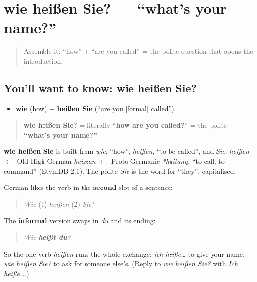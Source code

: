 \section[wie heißen Sie?]{wie heißen Sie? — \textquotedblleft{}what's your name?\textquotedblright{}}

\label{lesson:GE-C02-wie-heissen-sie}



\begin{quote}
Assemble it: \textquotedblleft{}how\textquotedblright{} + \textquotedblleft{}are you called\textquotedblright{} = the polite question that opens the introduction.
\end{quote}

\subsection*{You'll want to know: wie heißen Sie?}
\begin{itemize}
\raggedright
  \item \textbf{wie} (how) + \textbf{heißen Sie} (\textquotedblleft{}are you {[}formal{]} called\textquotedblright{}).
\end{itemize}

\begin{quote}
\textbf{wie heißen Sie?} = literally \textquotedblleft{}\textbf{how are you called?}\textquotedblright{} = the polite \textbf{\textquotedblleft{}what's your name?\textquotedblright{}}
\end{quote}

\begin{cousinweb}
\textbf{wie heißen Sie} is built from \emph{wie}, \textquotedblleft{}how\textquotedblright{}, \emph{heißen}, \textquotedblleft{}to be called\textquotedblright{}, and \emph{Sie}. \emph{heißen} $\leftarrow$ Old High German \emph{heizzan} $\leftarrow$ Proto-Germanic \emph{*haitaną}, \textquotedblleft{}to call, to command\textquotedblright{} (EtymDB 2.1). The polite \emph{Sie} is the word for \textquotedblleft{}they\textquotedblright{}, capitalised.
\end{cousinweb}

\begin{grammarlens}[title={Grammar Lens: verb in second place}]
German likes the verb in the \textbf{second} slot of a sentence:

\begin{quote}
\emph{Wie} (1) \emph{heißen} (2) \emph{Sie}?
\end{quote}

The \textbf{informal} version swaps in \emph{du} and its ending:

\begin{quote}
\emph{Wie \textbf{heißt du}?}
\end{quote}

So the one verb \emph{heißen} runs the whole exchange: \emph{ich heiße…} to give your name, \emph{wie heißen Sie?} to ask for someone else's. (Reply to \emph{wie heißen Sie?} with \emph{Ich heiße…}.)
\end{grammarlens}

